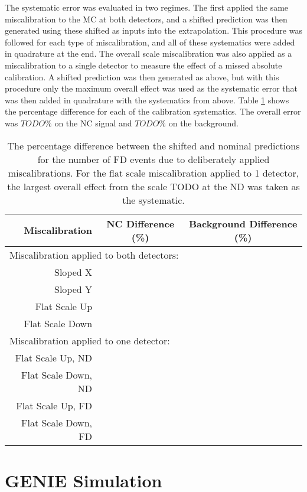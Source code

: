 \begin{doublespace}
The systematic error was evaluated in two regimes. The first applied the same miscalibration to the MC at both detectors, and a shifted prediction was then generated using these shifted as inputs into the extrapolation. This procedure was followed for each type of miscalibration, and all of these systematics were added in quadrature at the end. The overall scale miscalibration was also applied as a miscalibration to a single detector to measure the effect of a missed absolute calibration. A shifted prediction was then generated as above, but with this procedure only the maximum overall effect was used as the systematic error that was then added in quadrature with the systematics from above. Table \ref{tab:SystCalib} shows the percentage difference for each of the calibration systematics. The overall error was $TODO\%$ on the NC signal and $TODO\%$ on the background.
\begin{table}[h]
  \begin{center}
    \caption[Calibration Systematic Errors]{The percentage difference between the shifted and nominal predictions for the number of FD events due to deliberately applied miscalibrations. For the flat scale miscalibration applied to 1 detector, the largest overall effect from the scale TODO at the ND was taken as the systematic.}
    \label{tab:SystCalib}
    \begin{tabular}{r c c}
      \hline\hline
      Miscalibration & NC Difference (\%) & Background Difference (\%) \\
      \hline
      \multicolumn{3}{l}{Miscalibration applied to both detectors:} \\
      Sloped X & & \\
      Sloped Y & & \\
      Flat Scale Up & & \\
      Flat Scale Down & & \\
      \multicolumn{3}{l}{Miscalibration applied to one detector:} \\
      Flat Scale Up, ND & & \\
      Flat Scale Down, ND & & \\
      Flat Scale Up, FD & & \\
      Flat Scale Down, FD & & \\
      \hline
    \end{tabular}
  \end{center}
\end{table}

\section{GENIE Simulation}


\end{doublespace}
